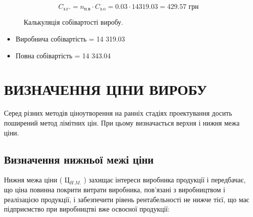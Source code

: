 \documentclass[a4paper,14pt]{extreport}
\begin{document}
 
    \begin{equation}
    C_{\text{з.г}}. = n_{\text{п.в}}\cdot C_{\text{з.o}} =  0.03\cdot  14319.03  = 429.57 \text{ грн}
    \end{equation}

    \begin{figure}
     \centering
    \caption{Калькуляція собівартості виробу.}
    \end{figure}


    \begin{itemize}
    \item Виробнича собівартість = 14 319.03
    \item Повна собівартість = 14 343.04
    \end{itemize}


 
\chapter{ВИЗНАЧЕННЯ ЦІНИ ВИРОБУ}
 Серед різних методів ціноутворення на ранніх стадіях проектування досить поширений метод лімітних цін. При цьому визначається верхня і нижня межа ціни.

 \section{Визначення нижньої межі ціни}
 Нижня межа ціни ( Ц$_{H.M.}$ ) захищає інтереси виробника продукції і
передбачає, що ціна повинна покрити витрати виробника, пов’язані з
виробництвом і реалізацією продукції, і забезпечити рівень рентабельності не нижче тієї, що має підприємство при виробництві вже освоєної продукції:
\end{document}
